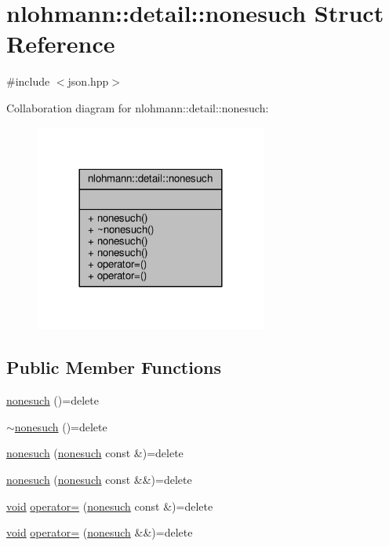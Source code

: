 \hypertarget{structnlohmann_1_1detail_1_1nonesuch}{}\section{nlohmann\+:\+:detail\+:\+:nonesuch Struct Reference}
\label{structnlohmann_1_1detail_1_1nonesuch}


{\ttfamily \#include $<$json.\+hpp$>$}



Collaboration diagram for nlohmann\+:\+:detail\+:\+:nonesuch\+:
\nopagebreak
\begin{figure}[H]
\begin{center}
\leavevmode
\includegraphics[width=216pt]{structnlohmann_1_1detail_1_1nonesuch__coll__graph}
\end{center}
\end{figure}
\subsection*{Public Member Functions}
\begin{DoxyCompactItemize}
\item 
\hyperlink{structnlohmann_1_1detail_1_1nonesuch_a6fe87da966856c6cb06617940d90f010}{nonesuch} ()=delete
\item 
\hyperlink{structnlohmann_1_1detail_1_1nonesuch_a7b1119845860e548b67f1644a2084373}{$\sim$nonesuch} ()=delete
\item 
\hyperlink{structnlohmann_1_1detail_1_1nonesuch_a563462ef2d05fe60cdf1dc7f567dc276}{nonesuch} (\hyperlink{structnlohmann_1_1detail_1_1nonesuch}{nonesuch} const \&)=delete
\item 
\hyperlink{structnlohmann_1_1detail_1_1nonesuch_ad7719f7d2a00263be8b8d123870217d8}{nonesuch} (\hyperlink{structnlohmann_1_1detail_1_1nonesuch}{nonesuch} const \&\&)=delete
\item 
\hyperlink{namespacenlohmann_1_1detail_a59fca69799f6b9e366710cb9043aa77d}{void} \hyperlink{structnlohmann_1_1detail_1_1nonesuch_add6ef84c52a851e391cef514c85f2ffe}{operator=} (\hyperlink{structnlohmann_1_1detail_1_1nonesuch}{nonesuch} const \&)=delete
\item 
\hyperlink{namespacenlohmann_1_1detail_a59fca69799f6b9e366710cb9043aa77d}{void} \hyperlink{structnlohmann_1_1detail_1_1nonesuch_a78ca022a1b4defe4f7ba662843602231}{operator=} (\hyperlink{structnlohmann_1_1detail_1_1nonesuch}{nonesuch} \&\&)=delete
\end{DoxyCompactItemize}



